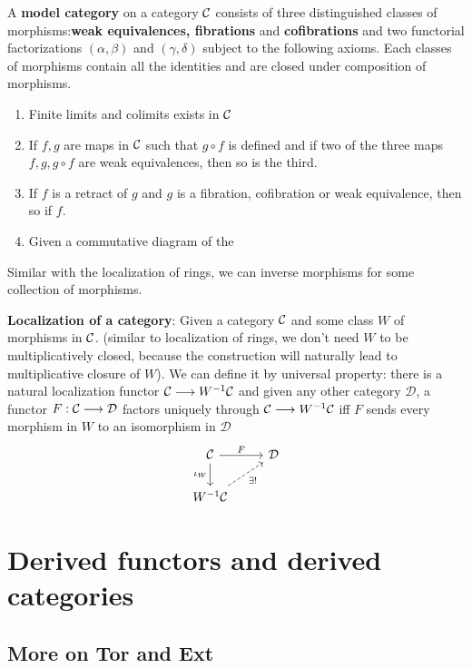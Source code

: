 \documentclass[11pt]{book} %
\begin{document}
\begin{definition}
A \textbf{model category} on a category ${\cal C}$ consists of three distinguished classes of morphisms:\textbf{weak equivalences, fibrations} and \textbf{cofibrations} and two functorial factorizations $(\alpha,\beta)$ and $(\gamma,\delta)$ subject to the following axioms. Each classes of morphisms contain all the identities and are closed under composition of morphisms.
\begin{enumerate}[label=MC\arabic*:]
\item Finite limits and colimits exists in ${\cal C}$
\item If $f,g$ are maps in ${\cal C}$ such that $g\circ f$ is defined and if two of the three maps $f,g,g\circ f$ are weak equivalences, then so is the third.
\item If $f$ is a retract of $g$ and $g$ is a fibration, cofibration or weak equivalence, then so if $f$.
\item Given a commutative diagram of the 
\end{enumerate} 
\end{definition}

Similar with the localization of rings, we can inverse morphisms for some collection of morphisms.
\begin{definition}\textbf{Localization of a category}:
Given a category ${\cal C}$ and some class $W$ of morphisms in ${\cal C}$. (similar to localization of rings, we don't need $W$ to be multiplicatively closed, because the construction will naturally lead to multiplicative closure of $W$). We can define it by universal property: there is a natural localization functor ${\cal C}\longrightarrow W^{-1}{\cal C}$ and given any other category $\mathcal{D}$, a functor $F:{\cal C}\longrightarrow\mathcal{D}$ factors uniquely through ${\cal C}\longrightarrow W^{-1}{\cal C}$ iff $F$ sends every morphism in $W$ to an isomorphism in $\mathcal{D}$
\[
\begin{tikzcd}
\calc \arrow[d, "\iota_W"'] \arrow[r, "F"] & \mathcal{D} \\
W^{-1}\calc \arrow[ru, "\exists!"', dashed] & 
\end{tikzcd}
\]
\end{definition}

\chapter{Derived functors and derived categories}
\section{More on Tor and Ext}
\end{document}

